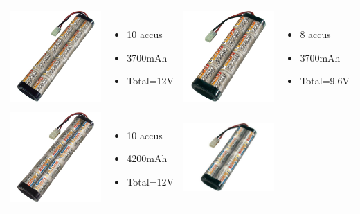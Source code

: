 \begin{tabular}{|m{4cm}|m{3.5cm}|m{4cm}|m{3.5cm}|}
\hline
 &  & & \\
 \includegraphics[width=4cm]{img/3700_10} & \begin{itemize}
 \item 10 accus  \item 3700mAh \item Total=12V  \end{itemize} & \includegraphics[width=4cm]{img/3700_8} & \begin{itemize}
 \item 8 accus  \item 3700mAh \item Total=9.6V  \end{itemize}  \\
\hline
 &  & & \\
 \includegraphics[width=4cm]{img/4200_10} & \begin{itemize}
 \item 10 accus  \item 4200mAh \item Total=12V  \end{itemize}  & \includegraphics[width=4cm]{img/4200_8} & \begin{itemize}

\end{itemize}
\end{tabular}

